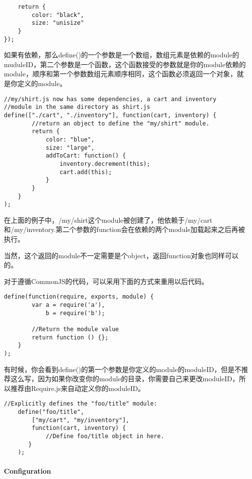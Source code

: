 \documentclass[12pt, oneside, b5paper]{book}
\begin{document}
\begin{CJK}{UTF8}{gkai}
\begin{lstlisting}
    return {
        color: "black",
        size: "unisize"
    }
});
	\end{lstlisting}

	如果有依赖，那么define()的一个参数是一个数组，数组元素是依赖的module的muduleID，第二个参数是一个函数，这个函数接受的参数就是你的module依赖的module，顺序和第一个参数数组元素顺序相同，这个函数必须返回一个对象，就是你定义的module。

	\begin{lstlisting}
//my/shirt.js now has some dependencies, a cart and inventory
//module in the same directory as shirt.js
define(["./cart", "./inventory"], function(cart, inventory) {
        //return an object to define the "my/shirt" module.
        return {
            color: "blue",
            size: "large",
            addToCart: function() {
                inventory.decrement(this);
                cart.add(this);
            }
        }
    }
);
	\end{lstlisting}

	在上面的例子中，/my/shirt这个module被创建了，他依赖于/my/cart和/my/inventory.第二个参数的function会在依赖的两个module加载起来之后再被执行。

	当然，这个返回的module不一定需要是个object，返回function对象也同样可以的。

	对于遵循CommonJS的代码，可以采用下面的方式来重用以后代码。

	\begin{lstlisting}
define(function(require, exports, module) {
        var a = require('a'),
            b = require('b');

        //Return the module value
        return function () {};
    }
);
	\end{lstlisting}

	有时候，你会看到define()的第一个参数是你定义的module的moduleID，但是不推荐这么写，因为如果你改变你的module的目录，你需要自己来更改moduleID，所以推荐由Require.js来自动定义你的moduleID。

	\begin{lstlisting}
//Explicitly defines the "foo/title" module:
    define("foo/title",
        ["my/cart", "my/inventory"],
        function(cart, inventory) {
            //Define foo/title object in here.
       }
    );
	\end{lstlisting}

	\paragraph{Configuration}


\end{CJK}
\end{document}
